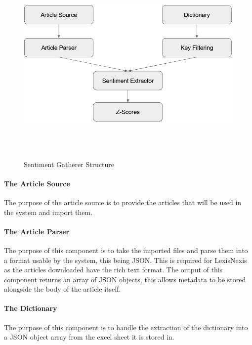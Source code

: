 \begin{figure}[h]
    \centering
    \includegraphics[width=15cm,height=10cm,keepaspectratio]{design/SentimentGathererStructure.png}
    \caption{Sentiment Gatherer Structure}
    \label{fig:sentimentgathererstructure}
\end{figure}

\paragraph{The Article Source}

The purpose of the article source is to provide the articles that will be used in the system and import them.

\paragraph{The Article Parser}

The purpose of this component is to take the imported files and parse them into a format usable by the system, this being JSON. This is required for LexisNexis as the articles downloaded have the rich text format. The output of this component returns an array of JSON objects, this allows metadata to be stored alongside the body of the article itself.

\paragraph{The Dictionary}

The purpose of this component is to handle the extraction of the dictionary into a JSON object array from the excel sheet it is stored in.

